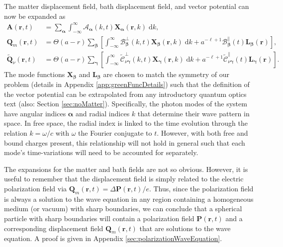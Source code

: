\documentclass{article}
\begin{document}
The matter displacement field, bath displacement field, and vector potential can now be expanded as
\begin{equation}\label{eq:fieldExpansions}
\begin{split}
\mathbf{A}(\mathbf{r},t) &= \sum_{\bm{\alpha}}\int_{-\infty}^\infty \mathcal{A}_{\bm{\alpha}}(k,t)\mathbf{X}_{\bm{\alpha}}(\mathbf{r},k)\;\mathrm{d}k,\\
\mathbf{Q}_m(\mathbf{r},t) &= \Theta(a - r)\sum_{\bm{\beta}}\left[\int_{-\infty}^\infty\mathcal{B}_{\bm{\beta}}^\perp(k,t)\mathbf{X}_{\bm{\beta}}(\mathbf{r},k)\;\mathrm{d}k + a^{-\ell + 1}\mathcal{B}_{\bm{\beta}}^\parallel(t)\mathbf{L}_{\bm{\beta}}(\mathbf{r})\right],\\
\tilde{\mathbf{Q}}_\nu(\mathbf{r},t) &= \Theta(a - r)\sum_{\bm{\gamma}}\left[\int_{-\infty}^\infty\tilde{\mathcal{C}}_{\nu\bm{\gamma}}^\perp(k,t)\mathbf{X}_{\bm{\gamma}}(\mathbf{r},k)\;\mathrm{d}k + a^{-\ell + 1}\tilde{\mathcal{C}}_{\nu\bm{\gamma}}^\parallel(t)\mathbf{L}_{\bm{\gamma}}(\mathbf{r})\right].
\end{split}
\end{equation}
The mode functions $\mathbf{X}_{\bm{\beta}}$ and $\mathbf{L}_{\bm{\beta}}$ are chosen to match the symmetry of our problem (details in Appendix \ref{app:greenFuncDetails}) such that the definition of the vector potential can be extrapolated from any introductory quantum optics text (also: Section \ref{sec:noMatter}). Specifically, the photon modes of the system have angular indices $\bm{\alpha}$ and radial indices $k$ that determine their wave pattern in space. In free space, the radial index is linked to the time evolution through the relation $k = \omega/c$ with $\omega$ the Fourier conjugate to $t$. However, with both free and bound charges present, this relationship will not hold in general such that each mode's time-variations will need to be accounted for separately.

The expansions for the matter and bath fields are not so obvious. However, it is useful to remember that the displacement field is simply related to the electric polarization field via $\mathbf{Q}_m(\mathbf{r},t) = \Delta\mathbf{P}(\mathbf{r},t)/e$. Thus, since the polarization field is always a solution to the wave equation in any region containing a homogeneous medium (or vacuum) with sharp boundaries, we can conclude that a spherical particle with sharp boundaries will contain a polarization field $\mathbf{P}(\mathbf{r},t)$ and a corresponding displacement field $\mathbf{Q}_m(\mathbf{r},t)$ that are solutions to the wave equation. A proof is given in Appendix \ref{sec:polarizationWaveEquation}.
\end{document}
